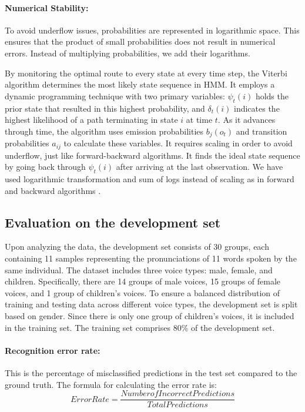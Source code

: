 \documentclass{article}
\begin{document}
\paragraph{Numerical Stability:}
To avoid underflow issues, probabilities are represented in logarithmic space. This ensures that the product of small probabilities does not result in numerical errors. Instead of multiplying probabilities, we add their logarithms.

By monitoring the optimal route to every state at every time step, the Viterbi algorithm determines the most likely state sequence in HMM. It employs a dynamic programming technique with two primary variables: $\psi_t(i)$ holds the prior state that resulted in this highest probability, and $\delta_t(i)$ indicates the highest likelihood of a path terminating in state $i$ at time $t$. As it advances through time, the algorithm uses emission probabilities $b_j(o_t)$ and transition probabilities $a_{ij}$ to calculate these variables. It requires scaling in order to avoid underflow, just like forward-backward algorithms. It finds the ideal state sequence by going back through $\psi_t(i)$ after arriving at the last observation. We have used logarithmic transformation and sum of logs instead of scaling as in forward and backward algorithms \citep{HMM}.






\subsection{Evaluation on the development set}

Upon analyzing the data, the development set consists of 30 groups, each containing 11 samples representing the pronunciations of 11 words spoken by the same individual. The dataset includes three voice types: male, female, and children. Specifically, there are 14 groups of male voices, 15 groups of female voices, and 1 group of children’s voices. To ensure a balanced distribution of training and testing data across different voice types, the development set is split based on gender. Since there is only one group of children’s voices, it is included in the training set. The training set comprises 80\% of the development set.

\paragraph{Recognition error rate:} This is the percentage of misclassified predictions in the test set compared to the ground truth. The formula for calculating the error rate is:
\begin{equation}
	Error Rate = \frac{Number of Incorrect Predictions}{Total Predictions}
\end{equation}
\end{document}
